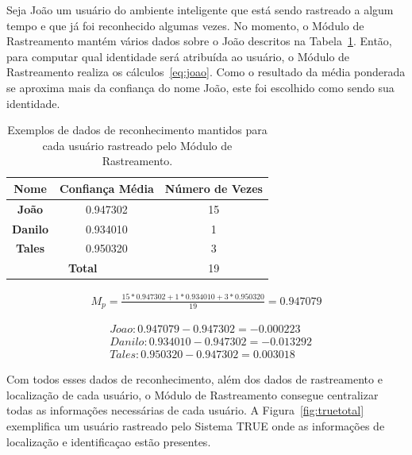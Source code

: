 	\begin{description}
 		Seja João um usuário do ambiente inteligente que está sendo rastreado a algum tempo e que já foi reconhecido algumas vezes. No momento, o Módulo de Rastreamento mantém vários dados sobre o João descritos na Tabela~\ref{tab:joao}. Então, para computar qual identidade será atribuída ao usuário, o Módulo de Rastreamento realiza os cálculos~\ref{eq:joao}. Como o resultado da média ponderada se aproxima mais da confiança do nome João, este foi escolhido como sendo sua identidade.
	\end{description}

	\begin{table}[htb]
		\begin{center}
			\caption{Exemplos de dados de reconhecimento mantidos para cada usuário rastreado pelo Módulo de Rastreamento.}
			\label{tab:joao}
			\begin{tabular}{|c|c|c|}
				\hline \bf Nome & Confiança Média & Número de Vezes \\
				\hline \hline \bf João & 0.947302 & 15 \\
				\hline \bf  Danilo & 0.934010 & 1 \\
				\hline \bf Tales & 0.950320 & 3 \\
				\hline
				\hline \multicolumn{2}{|c|}{\bf Total}  & 19 \\
				\hline
			\end{tabular}
		\end{center}
	\end{table}

	\begin{align}
		\label{eq:joao}
		M_p = \frac{15 * 0.947302 + 1 * 0.934010 + 3 * 0.950320}{19} = 0.947079
	\end{align}

	\begin{align}
	\nonumber & Joao: 0.947079 - 0.947302 = -0.000223\\
		\nonumber & Danilo: 0.934010 - 0.947302 = -0.013292\\
		\nonumber & Tales: 0.950320 - 0.947302 = 0.003018
	\end{align}

	Com todos esses dados de reconhecimento, além dos dados de rastreamento e localização de cada usuário, o Módulo de Rastreamento consegue centralizar todas as informações necessárias de cada usuário. A Figura~\ref{fig:truetotal} exemplifica um usuário rastreado pelo Sistema TRUE onde as informações de localização e identificaçao estão presentes.

